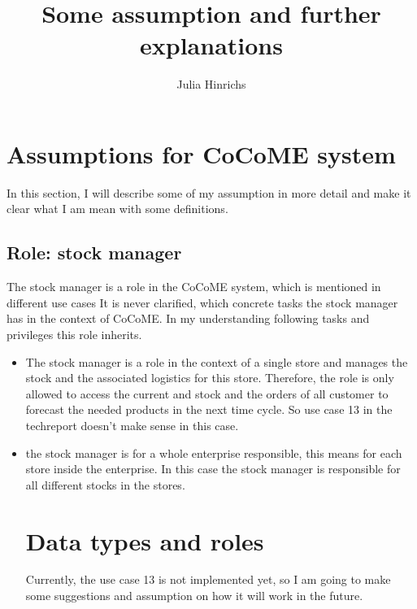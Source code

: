 \documentclass[10pt,a4paper]{article}
\begin{document}
\title{Some assumption and further explanations}
\author{Julia Hinrichs}

\section{Assumptions for CoCoME system}
In this section, I will describe some of my assumption in more detail and make it clear what I am mean with some definitions.
\subsection{Role: stock manager}
The stock manager is a role in the CoCoME system, which is mentioned in different use cases %
It is never clarified, which concrete tasks the stock manager has in the context of CoCoME. In my understanding following tasks and privileges this role inherits.
\begin{itemize}
\item The stock manager is a role in the context of a single store and manages the stock and the associated logistics for this store. Therefore, the role is only allowed to access the current and stock and the orders of all customer to forecast the needed products in the next time cycle. So use case 13 in the techreport doesn't make sense in this case.
\item the stock manager is for a whole enterprise responsible, this means for each store inside the enterprise. In this case the stock manager is responsible for all different stocks in the stores. 

\section{Data types and roles}
Currently, the use case 13 is not implemented yet, so I am going to make some suggestions and assumption on how it will work in the future.
\end{itemize}
\end{document}
